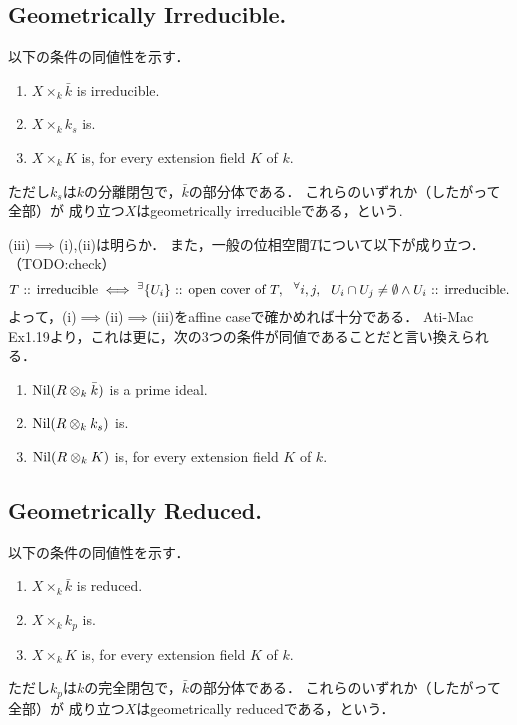 \documentclass[a4paper]{jsarticle}
\begin{document}
    \subsection{Geometrically Irreducible.}
    以下の条件の同値性を示す．
    \begin{enumerate}[label=(\roman*)]
        \item $X \times_k \bar{k}$ is irreducible.
        \item $X \times_k k_s$ is.
        \item $X \times_k K$ is, for every extension field $K$ of $k$.
    \end{enumerate}
    ただし$k_s$は$k$の分離閉包で，$\bar{k}$の部分体である．
    これらのいずれか（したがって全部）が
    成り立つ$X$はgeometrically irreducibleである，という.

    (iii)$\implies$(i),(ii)は明らか．
    また，一般の位相空間$T$について以下が成り立つ．
    （TODO:check）
    \[
        T\text{ :: irreducible}
        \iff
        {}^{\exists} \{U_i\}\text{ :: open cover of }T,~~
        {}^{\forall} i,j,~~ U_i \cap U_j \neq \emptyset \land U_i\text{ :: irreducible.}
    \]
    よって，(i)$\implies$(ii)$\implies$(iii)をaffine caseで確かめれば十分である．
    Ati-Mac Ex1.19より，これは更に，次の3つの条件が同値であることだと言い換えられる．
    \begin{enumerate}[label=(\roman*)]
        \item $\operatorname{Nil}(R \otimes_k \bar{k})$ is a prime ideal.
        \item $\operatorname{Nil}(R \otimes_k k_s)$ is.
        \item $\operatorname{Nil}(R \otimes_k K)$ is, for every extension field $K$ of $k$.
    \end{enumerate}

    \subsection{Geometrically Reduced.}
    以下の条件の同値性を示す．
    \begin{enumerate}[label=(\roman*)]
        \item $X \times_k \bar{k}$ is reduced.
        \item $X \times_k k_p$ is.
        \item $X \times_k K$ is, for every extension field $K$ of $k$.
    \end{enumerate}
    ただし$k_p$は$k$の完全閉包で，$\bar{k}$の部分体である．
    これらのいずれか（したがって全部）が
    成り立つ$X$はgeometrically reducedである，という．
\end{document}

